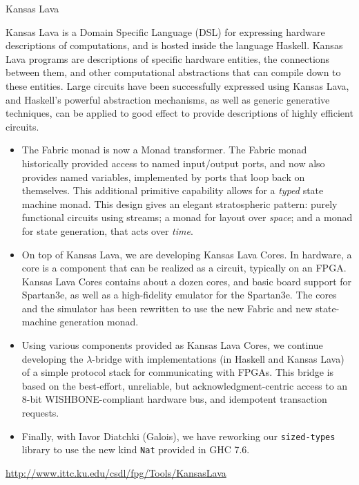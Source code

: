 \begin{hcarentry}[updated]{Kansas Lava}
\label{klava}
\makeheader

Kansas Lava is a Domain Specific Language (DSL) for expressing
hardware descriptions of computations, and is hosted inside the
language Haskell. Kansas Lava programs are descriptions of specific hardware
entities, the connections between them, and other computational abstractions
that can compile down to these entities. Large circuits have been successfully
expressed using Kansas Lava, and Haskell's powerful abstraction mechanisms, as
well as generic generative techniques, can be applied to good effect to provide
descriptions of highly efficient circuits.

\begin{itemize}

\item The Fabric monad is now a Monad transformer.
The Fabric monad historically provided access to named input/output ports,
and now also provides named variables, implemented by ports that loop back on
themselves. This additional primitive capability allows for a {\em typed\/}
state machine monad.
This design gives an elegant stratospheric pattern: purely functional circuits using streams;
a monad for layout over {\em space\/}; and a monad for state generation,
that acts over {\em time\/}.

\item 
On top of Kansas Lava, we are developing Kansas Lava Cores.
In hardware, a core is a component
that can be realized as a circuit, typically on an FPGA. Kansas Lava Cores
contains about a dozen cores, and basic board support for Spartan3e,
as well as a high-fidelity emulator for the Spartan3e. The
cores and the simulator has been rewritten to use the new Fabric
and new state-machine generation monad.

\item Using various components provided as Kansas Lava Cores, 
we continue developing the $\lambda$-bridge 
with implementations (in Haskell and
Kansas Lava) of a simple protocol stack for communicating with FPGAs.
This bridge is based on the best-effort, unreliable,
but acknowledgment-centric access to an 8-bit WISHBONE-compliant hardware bus,
and idempotent transaction requests.

\item Finally, with Iavor Diatchki (Galois), we have reworking
our {\tt sized-types\/} library to use the new kind {\tt Nat} provided
in GHC 7.6.
\end{itemize}

\FurtherReading
\begin{compactitem}
\item
  \url{http://www.ittc.ku.edu/csdl/fpg/Tools/KansasLava}
\end{compactitem}
\end{hcarentry}
